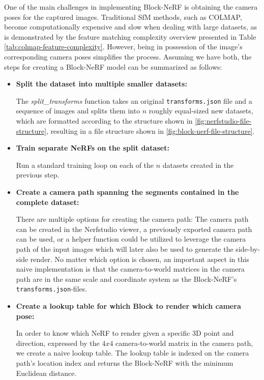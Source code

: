 One of the main challenges in implementing Block-NeRF is obtaining the camera poses for the captured images. Traditional SfM methods, such as COLMAP, become computationally expensive and slow when dealing with large datasets, as is demonstrated by the feature matching complexity overview presented in Table \ref{tab:colmap-feature-complexity}. However, being in possession of the image's corresponding camera poses simplifies the process. Assuming we have both, the steps for creating a Block-NeRF model can be summarized as follows:

\begin{itemize}
    \item \textbf{Split the dataset into multiple smaller datasets:} 

    The \textit{split\_transforms} function takes an original \texttt{transforms.json} file and a sequence of images and splits them into $n$ roughly equal-sized new datasets, which are formatted according to the structure shown in \autoref{fig:nerfstudio-file-structure}, resulting in a file structure shown in \autoref{fig:block-nerf-file-structure}.

    \item \textbf{Train separate NeRFs on the split dataset:} 

    Run a standard training loop on each of the $n$ datasets created in the previous step.
    
    \item \textbf{Create a camera path spanning the segments contained in the complete dataset:}
    
    There are multiple options for creating the camera path: The camera path can be created in the Nerfstudio viewer, a previously exported camera path can be used, or a helper function could be utilized to leverage the camera path of the input images which will later also be used to generate the side-by-side render. No matter which option is chosen, an important aspect in this naive implementation is that the camera-to-world matrices in the camera path are in the same scale and coordinate system as the Block-NeRF's \texttt{transforms.json}-files.
    
    \item \textbf{Create a lookup table for which Block to render which camera pose:}

    In order to know which NeRF to render given a specific 3D point and direction, expressed by the $4x4$ camera-to-world matrix in the camera path, we create a naive lookup table. The lookup table is indexed on the camera path's location index and returns the Block-NeRF with the minimum Euclidean distance.


\end{itemize}
